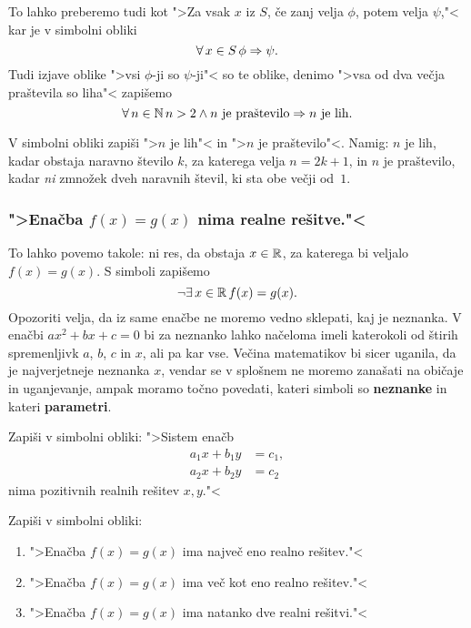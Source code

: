 To lahko preberemo tudi kot ">Za vsak $x$ iz $S$, če zanj velja $\phi$,
potem velja $\psi$,"< kar je v simbolni obliki
%
\begin{equation*}
  \forall\, x \in S \, \phi \Rightarrow \psi.
\end{equation*}
%
Tudi izjave oblike ">vsi $\phi$-ji so $\psi$-ji"< so te oblike, denimo ">vsa
od dva večja praštevila so liha"< zapišemo
%
\begin{equation*}
  \forall\, n \in \mathbb{N} \, n > 2 \land \text{$n$ je praštevilo} \Rightarrow \text{$n$ je lih}.
\end{equation*}

\begin{naloga}
  V simbolni obliki zapiši ">$n$ je lih"< in ">$n$ je praštevilo"<.
  Namig: $n$ je lih, kadar obstaja naravno število $k$, za katerega
  velja $n = 2 k + 1$, in $n$ je praštevilo, kadar \emph{ni} zmnožek
  dveh naravnih števil, ki sta obe večji od~$1$.
\end{naloga}


\subsubsection{">Enačba $f(x) = g(x)$ nima realne rešitve."<}

To lahko povemo takole: ni res, da obstaja $x \in \mathbb{R}$, za katerega bi
veljalo $f(x) = g(x)$. S simboli zapišemo
%
\begin{equation*}
  \lnot \exists\, x \in \mathbb{R} \, f(x) = g(x).
\end{equation*}
%
Opozoriti velja, da iz same enačbe ne moremo vedno sklepati, kaj je
neznanka. V enačbi $a x^2 + b x + c = 0$ bi za neznanko lahko načeloma
imeli katerokoli od štirih spremenljivk $a$, $b$, $c$ in $x$, ali pa
kar vse. Večina matematikov bi sicer uganila, da je najverjetneje
neznanka $x$, vendar se v splošnem ne moremo zanašati na običaje in
uganjevanje, ampak moramo točno povedati, kateri simboli so
\textbf{neznanke} in kateri \textbf{parametri}.

\begin{naloga}
  Zapiši v simbolni obliki: ">Sistem enačb
  \begin{align*}
    a_1 x + b_1 y &= c_1,\\
    a_2 x + b_2 y &= c_2
  \end{align*}
  nima pozitivnih realnih rešitev $x, y$."<
\end{naloga}

\begin{naloga}
  Zapiši v simbolni obliki:
  \begin{enumerate}
  \item ">Enačba $f(x) = g(x)$ ima največ eno realno rešitev."<
  \item ">Enačba $f(x) = g(x)$ ima več kot eno realno rešitev."<
  \item ">Enačba $f(x) = g(x)$ ima natanko dve realni rešitvi."<
  \end{enumerate}
\end{naloga}


